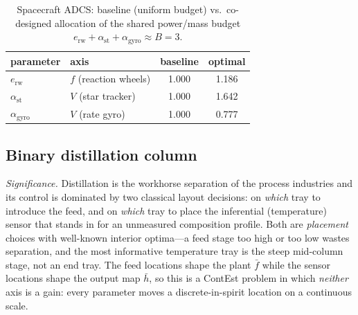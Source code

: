 \documentclass[twocolumn,amsthm]{autart}
\begin{document}
\begin{table}[t]
\centering
\caption{Spacecraft ADCS: baseline (uniform budget) vs.\ co-designed allocation of
the shared power/mass budget $e_{\mathrm{rw}}+\alpha_{\mathrm{st}}+\alpha_{\mathrm{gyro}}\approx B=3$.}
\label{tab:adcs}
\begin{tabular}{llcc}
\hline
parameter & axis & baseline & optimal \\
\hline
$e_{\mathrm{rw}}$       & $f$ (reaction wheels) & 1.000 & 1.186 \\
$\alpha_{\mathrm{st}}$  & $V$ (star tracker)    & 1.000 & 1.642 \\
$\alpha_{\mathrm{gyro}}$& $V$ (rate gyro)       & 1.000 & 0.777 \\
\hline
\end{tabular}
\end{table}

\subsection{Binary distillation column}
\label{sec:sim:distill}

\emph{Significance.} Distillation is the workhorse separation of the process
industries and its control is dominated by two classical layout decisions: on
\emph{which} tray to introduce the feed, and on \emph{which} tray to place the
inferential (temperature) sensor that stands in for an unmeasured composition
profile. Both are \emph{placement} choices with well-known interior optima---a
feed stage too high or too low wastes separation, and the most informative
temperature tray is the steep mid-column stage, not an end tray. The feed
locations shape the plant $\bar f$ while the sensor locations shape the output map
$\bar h$, so this is a ContEst problem in which \emph{neither} axis is a
gain: every parameter moves a discrete-in-spirit location on a continuous scale.
\end{document}
